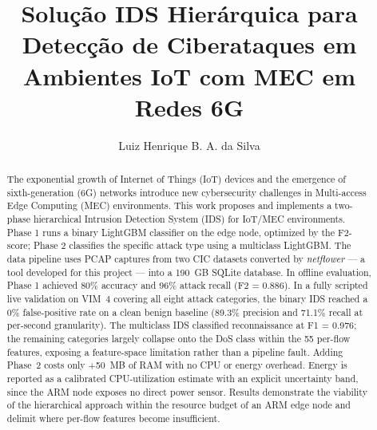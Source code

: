 \documentclass[12pt]{article}
\title{Solução IDS Hierárquica para Detecção de Ciberataques em Ambientes IoT com MEC em Redes 6G}
\author{Luiz Henrique B. A. da Silva\inst{1}}
\begin{document}
\maketitle

\begin{abstract}
The exponential growth of Internet of Things (IoT) devices and the emergence
of sixth-generation (6G) networks introduce new cybersecurity challenges in
Multi-access Edge Computing (MEC) environments. This work proposes and
implements a two-phase hierarchical Intrusion Detection System (IDS) for
IoT/MEC environments. Phase 1 runs a binary LightGBM classifier on the edge
node, optimized by the F2-score; Phase 2 classifies the specific attack type
using a multiclass LightGBM. The data
pipeline uses PCAP captures from two CIC datasets converted by
\textit{netflower} — a tool developed for this project — into a 190~GB SQLite
database. In offline evaluation, Phase 1 achieved 80\% accuracy and 96\%
attack recall (F2 = 0.886). In a fully scripted live validation on VIM~4
covering all eight attack categories, the binary IDS reached a 0\%
false-positive rate on a clean benign baseline (89.3\% precision and 71.1\%
recall at per-second granularity). The multiclass IDS classified
reconnaissance at F1 = 0.976; the remaining categories largely collapse onto
the DoS class within the 55 per-flow features, exposing a feature-space
limitation rather than a pipeline fault. Adding Phase~2 costs only +50~MB of
RAM with no CPU or energy overhead. Energy is reported as a calibrated
CPU-utilization estimate with an explicit uncertainty band, since the ARM node
exposes no direct power sensor. Results demonstrate the viability of the
hierarchical approach within the resource budget of an ARM edge node and
delimit where per-flow features become insufficient.
\end{abstract}
\end{document}
